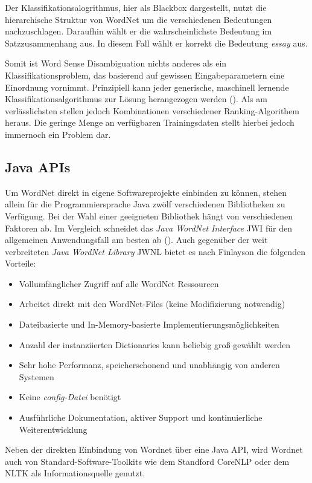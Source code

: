Der Klassifikationsalogrithmus, hier als Blackbox dargestellt, nutzt die hierarchische Struktur von WordNet um die verschiedenen Bedeutungen nachzuschlagen. Daraufhin wählt er die wahrscheinlichste Bedeutung im Satzzusammenhang aus. In diesem Fall wählt er korrekt die Bedeutung \textit{essay} aus.
\par
Somit ist Word Sense Disambiguation nichts anderes als ein Klassifikationsproblem, das basierend auf gewissen Eingabeparametern eine Einordnung vornimmt. Prinzipiell kann jeder generische, maschinell lernende Klassifikationsalgorithmus zur Lösung herangezogen werden (\cite[vgl.][326]{YAROWSKY}). Als am verlässlichsten stellen jedoch Kombinationen verschiedener Ranking-Algorithem heraus. Die geringe Menge an verfügbaren Trainingsdaten stellt hierbei jedoch immernoch ein Problem dar.


\subsection{Java APIs}

Um WordNet direkt in eigene Softwareprojekte einbinden zu können, stehen allein für die Programmiersprache Java zwölf verschiedenen Bibliotheken zu Verfügung. Bei der Wahl einer geeigneten Bibliothek hängt von verschiedenen Faktoren ab. Im Vergleich schneidet das \textit{Java WordNet Interface} \ac{JWI} für den allgemeinen Anwendungsfall am besten ab (\cite[vgl.][2]{FINLAYSON}). Auch gegenüber der weit verbreiteten \textit{Java WordNet Library} \ac{JWNL} bietet es nach Finlayson die folgenden Vorteile:

\begin{itemize} 
\item Vollumfänglicher Zugriff auf alle WordNet Ressourcen
\item Arbeitet direkt mit den WordNet-Files (keine Modifizierung notwendig)
\item Dateibasierte und In-Memory-basierte Implementierungsmöglichkeiten
\item Anzahl der instanziierten Dictionaries kann beliebig groß gewählt werden
\item Sehr hohe Performanz, speicherschonend und unabhängig von anderen Systemen
\item Keine \textit{config-Datei} benötigt 
\item Ausführliche Dokumentation, aktiver Support und kontinuierliche Weiterentwicklung
\end{itemize}

Neben der direkten Einbindung von Wordnet über eine Java API, wird Wordnet auch von Standard-Software-Toolkits wie dem Standford CoreNLP oder dem NLTK als Informationsquelle genutzt.